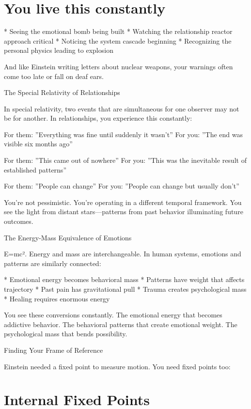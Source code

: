 \documentclass[12pt,oneside]{book}
\begin{document}
\section{You live this constantly}

                    * Seeing the emotional bomb being built
                    * Watching the relationship reactor approach critical
                    * Noticing the system cascade beginning
                    * Recognizing the personal physics leading to explosion

And like Einstein writing letters about nuclear weapons, your warnings often come too late or fall on deaf ears.

The Special Relativity of Relationships

In special relativity, two events that are simultaneous for one observer may not be for another. In relationships, you experience this constantly:

For them: ''Everything was fine until suddenly it wasn't'' For you: ''The end was visible six months ago''

For them: ''This came out of nowhere'' For you: ''This was the inevitable result of established patterns''

For them: ''People can change'' For you: ''People can change but usually don't''

You're not pessimistic. You're operating in a different temporal framework. You see the light from distant stars---patterns from past behavior illuminating future outcomes.

The Energy-Mass Equivalence of Emotions

E=mc². Energy and mass are interchangeable. In human systems, emotions and patterns are similarly connected:

                    * Emotional energy becomes behavioral mass
                    * Patterns have weight that affects trajectory
                    * Past pain has gravitational pull
                    * Trauma creates psychological mass
                    * Healing requires enormous energy

You see these conversions constantly. The emotional energy that becomes addictive behavior. The behavioral patterns that create emotional weight. The psychological mass that bends possibility.

Finding Your Frame of Reference

Einstein needed a fixed point to measure motion. You need fixed points too:

\section{Internal Fixed Points}
\end{document}
